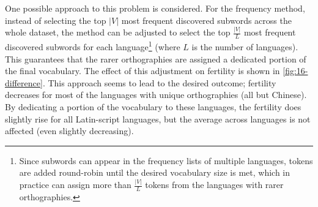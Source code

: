 One possible approach to this problem is considered. For the frequency method, instead of selecting the top $|V|$ most frequent discovered subwords across the whole dataset, the method can be adjusted to select the top $\frac{|V|}{L}$ most frequent discovered subwords for each language\footnote{Since subwords can appear in the frequency lists of multiple languages, tokens are added round-robin until the desired vocabulary size is met, which in practice can assign more than $\frac{|V|}{L}$ tokens from the languages with rarer orthographies.} (where $L$ is the number of languages). This guarantees that the rarer orthographies are assigned a dedicated portion of the final vocabulary. The effect of this adjustment on fertility is shown in \cref{fig:16-difference}. This approach seems to lead to the desired outcome; fertility decreases for most of the languages with unique orthographies (all but Chinese). By dedicating a portion of the vocabulary to these languages, the fertility does slightly rise for all Latin-script languages, but the average across languages is not affected (even slightly decreasing). 






